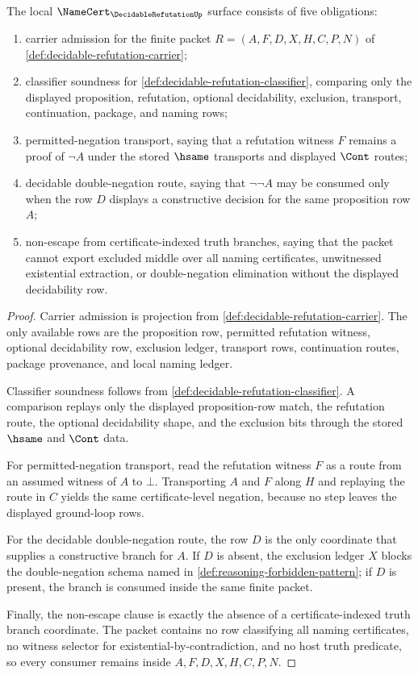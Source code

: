 \begin{theorem}
\label{thm:decidable-refutation-namecert-obligations}
The local $\NameCert_{\DecidableRefutationUp}$ surface consists of five obligations:
\begin{enumerate}
\item carrier admission for the finite packet $R=(A,F,D,X,H,C,P,N)$ of \autoref{def:decidable-refutation-carrier};
\item classifier soundness for \autoref{def:decidable-refutation-classifier}, comparing only the displayed proposition, refutation, optional decidability, exclusion, transport, continuation, package, and naming rows;
\item permitted-negation transport, saying that a refutation witness $F$ remains a proof of $\neg A$ under the stored $\hsame$ transports and displayed $\Cont$ routes;
\item decidable double-negation route, saying that $\neg\neg A$ may be consumed only when the row $D$ displays a constructive decision for the same proposition row $A$;
\item non-escape from certificate-indexed truth branches, saying that the packet cannot export excluded middle over all naming certificates, unwitnessed existential extraction, or double-negation elimination without the displayed decidability row.
\end{enumerate}
\end{theorem}
\begin{proof}
Carrier admission is projection from \autoref{def:decidable-refutation-carrier}. The only available rows are the proposition row, permitted refutation witness, optional decidability row, exclusion ledger, transport rows, continuation routes, package provenance, and local naming ledger.

Classifier soundness follows from \autoref{def:decidable-refutation-classifier}. A comparison replays only the displayed proposition-row match, the refutation route, the optional decidability shape, and the exclusion bits through the stored $\hsame$ and $\Cont$ data.

For permitted-negation transport, read the refutation witness $F$ as a route from an assumed witness of $A$ to $\bot$. Transporting $A$ and $F$ along $H$ and replaying the route in $C$ yields the same certificate-level negation, because no step leaves the displayed ground-loop rows.

For the decidable double-negation route, the row $D$ is the only coordinate that supplies a constructive branch for $A$. If $D$ is absent, the exclusion ledger $X$ blocks the double-negation schema named in \autoref{def:reasoning-forbidden-pattern}; if $D$ is present, the branch is consumed inside the same finite packet.

Finally, the non-escape clause is exactly the absence of a certificate-indexed truth branch coordinate. The packet contains no row classifying all naming certificates, no witness selector for existential-by-contradiction, and no host truth predicate, so every consumer remains inside $A,F,D,X,H,C,P,N$.
\end{proof}

